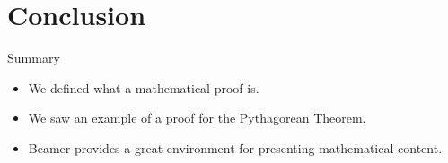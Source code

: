 \documentclass{beamer}
\theoremstyle{plain}
\theoremstyle{definition}
\theoremstyle{remark}
\begin{document}
\section{Conclusion}

\begin{frame}{Summary}
    \begin{itemize}
        \item We defined what a mathematical proof is.
        \item We saw an example of a proof for the Pythagorean Theorem.
        \item Beamer provides a great environment for presenting mathematical content.
    \end{itemize}
\end{frame}
\end{document}
